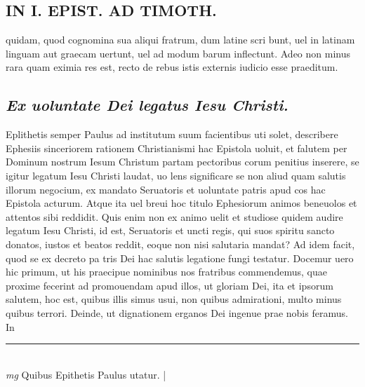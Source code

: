 \documentclass{article}
\begin{document}
\begin{pages}
\section*{IN I. EPIST. AD TIMOTH. }
\marginpar{[ p.compa]}\pstart quidam, quod cognomina sua aliqui fratrum, dum latine scri bunt, uel in latinam linguam aut graecam uertunt, uel ad modum barum inflectunt. Adeo non minus rara quam eximia res est, recto de rebus istis externis iudicio esse praeditum.   \pend
{}
{}
\subsection*{\textit{Ex uoluntate Dei legatus Iesu Christi. }}\pstart Eplithetis semper Paulus ad institutum suum facientibus uti solet, describere Ephesiis sinceriorem rationem Christianismi hac Epistola uoluit, et falutem per Dominum nostrum Iesum Christum partam pectoribus   corum penitius inserere, se igitur legatum Iesu Christi laudat, uo lens significare se non aliud quam salutis illorum negocium, ex mandato Seruatoris et uoluntate patris apud cos hac Epistola acturum.  Atque ita uel breui hoc titulo Ephesiorum animos beneuolos et attentos sibi reddidit.  Quis enim non ex animo uelit et studiose quidem audire legatum Iesu Christi, id est, Seruatoris et uncti regis, qui suos spiritu sancto donatos, iustos et beatos reddit, eoque non nisi salutaria mandat? Ad idem facit, quod se ex decreto pa tris Dei hac salutis legatione fungi testatur.   \pend\pstart Docemur uero hic primum, ut his praecipue nominibus nos fratribus commendemus, quae proxime fecerint ad promouendam apud illos, ut gloriam Dei, ita et ipsorum salutem, hoc est, quibus illis simus usui, non quibus admirationi, multo minus quibus terrori.  Deinde, ut dignationem erganos Dei ingenue prae nobis feramus.  In\pend\pstart  \pend
\vspace{0.5cm}\noindent
\vspace{0.2cm}\rule{1cm}{0.2pt}\\ 
\hspace{0.2cm}\textit{mg}
\footnotesize Quibus Epithetis Paulus utatur.  
\normalsize| 

\end{pages}
\end{document}
